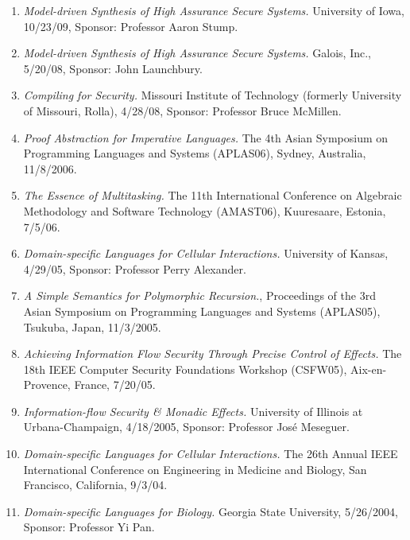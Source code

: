 \documentclass[12pt]{article} %
\begin{document}
\begin{enumerate}[leftmargin=0mm]
\item{\it Model-driven Synthesis of High Assurance Secure Systems.} University of Iowa, 10/23/09, Sponsor: Professor Aaron Stump.

\item{\it Model-driven Synthesis of High Assurance Secure Systems.} Galois, Inc., 5/20/08, Sponsor: John Launchbury.


\item{\it Compiling for Security.} Missouri Institute of Technology (formerly University of Missouri, Rolla), 4/28/08, Sponsor: Professor Bruce McMillen.

\item{\it Proof Abstraction for Imperative Languages.} The 4th Asian Symposium on Programming Languages and Systems (APLAS06), Sydney, Australia, 11/8/2006. 

\item{\it The Essence of Multitasking.} The 11th International Conference on Algebraic Methodology and Software Technology (AMAST06), Kuuresaare, Estonia, 7/5/06.

\item{\it Domain-specific Languages for Cellular Interactions.} University of Kansas, 4/29/05, Sponsor: Professor Perry Alexander. 

\item{\it A Simple Semantics for Polymorphic Recursion.}, Proceedings of the 3rd Asian Symposium on Programming Languages and Systems (APLAS05), Tsukuba, Japan, 11/3/2005.

\item{\it Achieving Information Flow Security Through Precise Control of Effects.} The 18th IEEE Computer Security Foundations Workshop (CSFW05), Aix-en-Provence, France, 7/20/05.

\item{\it Information-flow Security \& Monadic Effects.}
University of Illinois at Urbana-Champaign, 4/18/2005, Sponsor:
Professor Jos\'{e} Meseguer.

\item{\it Domain-specific Languages for Cellular Interactions.} The 26th Annual IEEE International Conference on Engineering in Medicine and Biology, San Francisco, California, 9/3/04.

\item{\it Domain-specific Languages for Biology.} Georgia State
  University, 5/26/2004, Sponsor: Professor Yi Pan.



\end{enumerate}
\end{document}

